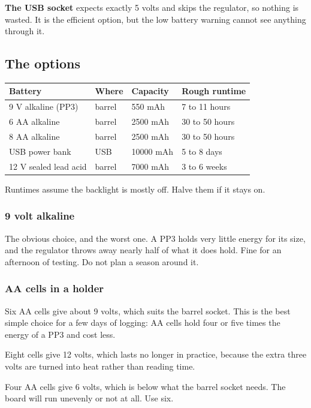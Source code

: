 \documentclass[11pt,a4paper]{article}
\newenvironment{caution}
  {\par\medskip\noindent
   \begin{lrbox}{\nfbox}\begin{minipage}{0.94\linewidth}\vspace{2pt}}
  {\vspace{2pt}\end{minipage}\end{lrbox}%
   \fcolorbox{warn}{white}{\usebox{\nfbox}}\par\medskip}
\begin{document}
\textbf{The USB socket} expects exactly 5 volts and skips the regulator, so
nothing is wasted. It is the efficient option, but the low battery warning
cannot see anything through it.

\subsection{The options}

\begin{center}
\begin{tabular}{llll}
\hline
\textbf{Battery} & \textbf{Where} & \textbf{Capacity} & \textbf{Rough runtime} \\
\hline
9 V alkaline (PP3) & barrel & 550 mAh & 7 to 11 hours \\
6 AA alkaline & barrel & 2500 mAh & 30 to 50 hours \\
8 AA alkaline & barrel & 2500 mAh & 30 to 50 hours \\
USB power bank & USB & 10000 mAh & 5 to 8 days \\
12 V sealed lead acid & barrel & 7000 mAh & 3 to 6 weeks \\
\hline
\end{tabular}
\end{center}

Runtimes assume the backlight is mostly off. Halve them if it stays on.

\subsubsection*{9 volt alkaline}

The obvious choice, and the worst one. A PP3 holds very little energy for its
size, and the regulator throws away nearly half of what it does hold. Fine for
an afternoon of testing. Do not plan a season around it.

\subsubsection*{AA cells in a holder}

Six AA cells give about 9 volts, which suits the barrel socket. This is the
best simple choice for a few days of logging: AA cells hold four or five times
the energy of a PP3 and cost less.

Eight cells give 12 volts, which lasts no longer in practice, because the extra
three volts are turned into heat rather than reading time.

\begin{caution}
Four AA cells give 6 volts, which is below what the barrel socket needs. The
board will run unevenly or not at all. Use six.
\end{caution}
\end{document}
